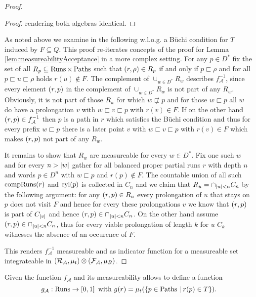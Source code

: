 \begin{proof}
\begin{proof}
    rendering both algebras identical.
  \end{proof}
  As noted above we examine in the following w.l.o.g. a Büchi condition for $T$
  induced by $F\subseteq Q$. This proof re-iterates concepts of the proof for
  Lemma \ref{lem:measureabilityAcceptance} in a more complex setting. For any
  $p\in D^{*}$ fix the set of all $R_{p}\subseteq\operatorname{Runs}\times\operatorname{Paths}$ such that
  $\left(r,\rho\right)\in R_{p}$ if and only if $p\sqsubset\rho$ and for all
  $p\sqsubset u\sqsubset\rho$ holds $r(u)\notin F$. The complement of
  $\cup_{w\in D^{*}}R_{w}$ describes $f_{\mathcal{A}}^{-1}$, since every
  element $\left(r,p\right)$ in the complement of $\cup_{w\in D^{*}}R_{w}$ is not
  part of any $R_{w}$. Obviously, it is not part of those $R_{w}$ for which
  $w\not\sqsubset p$ and for those $w\sqsubset p$ all $w$ do have a prolongation
  $v$ with $w\sqsubset v\sqsubset p$ with $r(v)\in F$. If on the other hand
  $\left(r,p\right)\in f_{\mathcal{A}}^{-1}$ then $p$ is a path in $r$ which
  satisfies the Büchi condition and thus for every prefix $w\sqsubset p$ there
  is a later point $v$ with $w\sqsubset v\sqsubset p$ with $r(v)\in F$ which
  makes $\left(r,p\right)$ not part of any $R_{w}$.

  It remains to show that $R_{w}$ are measureable for every $w\in D^{*}$. Fix
  one such $w$ and for every $n>\left\vert{w}\right\vert$ gather for all balanced proper
  partial runs $r$ with depth $n$ and words $p\in D^{n}$ with $w\sqsubset p$
  and $r(p)\notin F$. The countable union of all such $\operatorname{compRuns}(r)$ and
  $\operatorname{cyl}(p)$ is collected in $C_{n}$ and we claim that
  $R_{u} = \cap_{\left\vert{u}\right\vert<n}C_{n}$ by the following argument: for any
  $\left(r,p\right)\in R_{u}$ every prolongation of $u$ that stays on $p$ does not
  visit $F$ and hence for every these prolongations $v$ we know that
  $\left(r,p\right)$ is part of $C_{\left\vert{v}\right\vert}$ and hence
  $\left(r,p\right)\in\cap_{\left\vert{u}\right\vert<n}C_{n}$. On the other hand assume
  $\left(r,p\right)\in\cap_{\left\vert{u}\right\vert<n}C_{n}$, thus for every viable prolongation
  of length $k$ for $u$ $C_{k}$ witnesses the absence of an occurence of $F$.
  
  This renders $f_{\mathcal{A}}^{-1}$ measureable and as indicator function for
  a measureable set integrateable in
  $\left(\mathcal{R}_{\mathcal{A}},\mu_{t}\right)\otimes
  \left(\mathcal{F}_{\mathcal{A}},\mu_{B}\right)$.
\end{proof}
Given the function $f_{\mathcal{A}}$ and its measureability allows to define
a function
\begin{equation*}
  g_{\mathcal{A}}:\operatorname{Runs}\rightarrow\left[0,1\right]
  \text{ with }
  g(r) = \mu_{t}(\left\{p\in\operatorname{Paths}\mid r(p)\in T\right\}).
\end{equation*}
